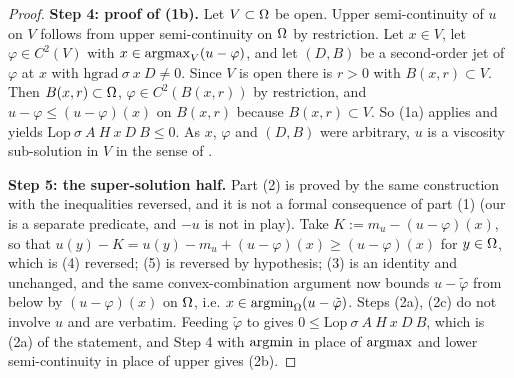 \begin{proof}
\medskip\noindent\textbf{Step 4: proof of (1b).} Let $V\subset\Omega$ be open. Upper
semi-continuity of $u$ on $V$ follows from upper semi-continuity on $\Omega$ by restriction.
Let $x\in V$, let $\varphi\in C^{2}(V)$ with $x\in\operatorname*{argmax}_V(u-\varphi)$, and let $(D,B)$
be a second-order jet of $\varphi$ at $x$ with
$\mathrm{hgrad}\ \sigma\ x\ D\ne0$. Since $V$ is open there is $r>0$ with
$B(x,r)\subset V$. Then $B(x,r)\subset\Omega$, $\varphi\in C^{2}(B(x,r))$ by restriction, and
$u-\varphi\le(u-\varphi)(x)$ on $B(x,r)$ because $B(x,r)\subset V$. So (1a) applies and
yields $\mathrm{Lop}\ \sigma\ A\ H\ x\ D\ B\le0$. As $x$, $\varphi$ and $(D,B)$ were
arbitrary, $u$ is a viscosity sub-solution in $V$ in the sense of .

\medskip\noindent\textbf{Step 5: the super-solution half.} Part (2) is proved by the same
construction with the inequalities reversed, and it is not a formal consequence of part (1)
(our  is a separate predicate, and $-u$ is not in play). Take
$K:=m_u-(u-\varphi)(x)$, so that $u(y)-K=u(y)-m_u+(u-\varphi)(x)\ge(u-\varphi)(x)$ for
$y\in\Omega$, which is (4) reversed; (5) is reversed by hypothesis; (3) is an identity and
unchanged, and the same convex-combination argument now bounds $u-\tilde\varphi$ from
below by $(u-\varphi)(x)$ on $\Omega$, i.e. $x\in\operatorname*{argmin}_\Omega(u-\tilde\varphi)$. Steps (2a),
(2c) do not involve $u$ and are verbatim. Feeding $\tilde\varphi$ to
 gives $0\le\mathrm{Lop}\ \sigma\ A\ H\ x\ D\ B$, which is (2a) of
the statement, and Step 4 with $\operatorname*{argmin}$ in place of $\operatorname*{argmax}$ and lower semi-continuity in
place of upper gives (2b).
\end{proof}
